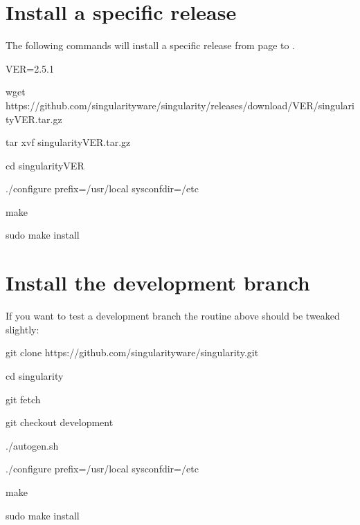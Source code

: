 \documentclass[letterpaper,10pt,english]{sphinxmanual}
\begin{document}
\section{Install a specific release}
\label{\detokenize{installation:install-a-specific-release}}
The following commands will install a specific release from  page to .

%
\begin{sphinxVerbatim}[commandchars=\\\{\}]
\PYGZdl{} VER=2.5.1

\PYGZdl{} wget https://github.com/singularityware/singularity/releases/download/\PYGZdl{}VER/singularity\PYGZhy{}\PYGZdl{}VER.tar.gz

\PYGZdl{} tar xvf singularity\PYGZhy{}\PYGZdl{}VER.tar.gz

\PYGZdl{} cd singularity\PYGZhy{}\PYGZdl{}VER

\PYGZdl{} ./configure \PYGZhy{}\PYGZhy{}prefix=/usr/local \PYGZhy{}\PYGZhy{}sysconfdir=/etc

\PYGZdl{} make

\PYGZdl{} sudo make install
\end{sphinxVerbatim}


\section{Install the development branch}
\label{\detokenize{installation:install-the-development-branch}}
If you want to test a development branch the routine above should be
tweaked slightly:

%
\begin{sphinxVerbatim}[commandchars=\\\{\}]
\PYGZdl{} git clone https://github.com/singularityware/singularity.git

\PYGZdl{} cd singularity

\PYGZdl{} git fetch

\PYGZdl{} git checkout development

\PYGZdl{} ./autogen.sh

\PYGZdl{} ./configure \PYGZhy{}\PYGZhy{}prefix=/usr/local \PYGZhy{}\PYGZhy{}sysconfdir=/etc

\PYGZdl{} make

\PYGZdl{} sudo make install
\end{sphinxVerbatim}
\end{document}
